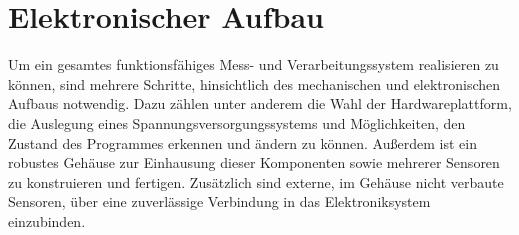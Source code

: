 \section{Elektronischer Aufbau}
\label{sec:Elektronik}
Um ein gesamtes funktionsfähiges Mess- und Verarbeitungssystem realisieren zu können, sind mehrere Schritte, hinsichtlich des mechanischen und elektronischen Aufbaus notwendig. Dazu zählen unter anderem die Wahl der Hardwareplattform, die Auslegung eines Spannungsversorgungssystems und Möglichkeiten, den Zustand des Programmes erkennen und ändern zu können. Außerdem ist ein robustes Gehäuse zur Einhausung dieser Komponenten sowie mehrerer Sensoren zu konstruieren und fertigen. Zusätzlich sind externe, im Gehäuse nicht verbaute Sensoren, über eine zuverlässige Verbindung in das Elektroniksystem einzubinden.

